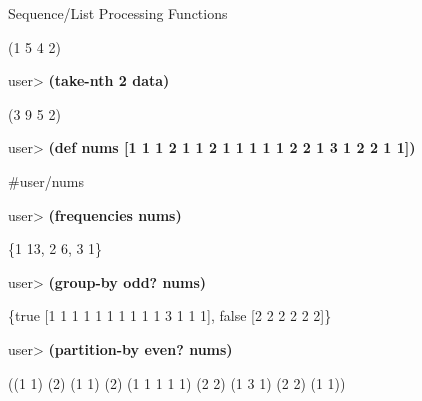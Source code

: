 \documentclass{beamer}
\begin{document}
\begin{frame}[allowframebreaks]{Sequence/List Processing Functions}
\begin{itemize}
{\ttfamily\color{black}
(1 5 4 2)}

{\ttfamily\color{black}
\textcolor[rgb]{0.49803922,0.0,0.49803922}{user{\textgreater}
}\textbf{(take-nth 2 data)}}

{\ttfamily\color{black}
(3 9 5 2)}


  \framebreak


{\ttfamily\color{black}
%
\textcolor[rgb]{0.49803922,0.0,0.49803922}{user{\textgreater}
}\textbf{(def nums [1 1 1 2 1 1 2 1 1 1 1 1 2 2 1 3 1 2 2 1 1])}}

{\ttfamily\color{black}
\#{\textquotesingle}user/nums}

{\ttfamily\color{black}
%
\textcolor[rgb]{0.49803922,0.0,0.49803922}{user{\textgreater}
}\textbf{(frequencies nums)}}

{\ttfamily\color{black}
\{1 13, 2 6, 3 1\}}

{\ttfamily\color{black}
\textcolor[rgb]{0.49803922,0.0,0.49803922}{user{\textgreater}
}\textbf{(group-by odd? nums)}}

{\ttfamily\color{black}
\{true [1 1 1 1 1 1 1 1 1 1 3 1 1 1], false [2 2 2 2 2 2]\}}

{\ttfamily\color{black}
\textcolor[rgb]{0.49803922,0.0,0.49803922}{user{\textgreater}
}\textbf{(partition-by even? nums)}}

{\ttfamily\color{black}
((1 1) (2) (1 1) (2) (1 1 1 1 1) (2 2) (1 3 1) (2 2) (1 1))}

  \end{itemize}
\end{frame}
\end{document}
